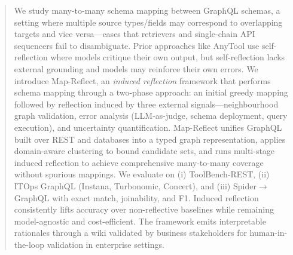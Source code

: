 \documentclass[sigconf, nonacm]{acmart}
\newcommand{\deleted}[1]{\textcolor{red}{#1}}
\begin{document}
\begin{abstract}

We study many-to-many schema mapping between GraphQL schemas, a setting where multiple source types/fields may correspond to overlapping targets and vice versa—cases that retrievers and single-chain API sequencers fail to disambiguate. Prior approaches like AnyTool use self-reflection where models critique their own output, but self-reflection lacks external grounding and models may reinforce their own errors. We introduce Map-Reflect, an \emph{induced reflection} framework that performs schema mapping through a two-phase approach: an initial greedy mapping followed by reflection induced by three external signals—neighbourhood graph validation, error analysis (LLM-as-judge, schema deployment, query execution), and uncertainty quantification. Map-Reflect unifies GraphQL built over REST and databases into a typed graph representation, applies domain-aware clustering to bound candidate sets, and runs multi-stage induced reflection to achieve comprehensive many-to-many coverage without spurious mappings. We evaluate on (i) ToolBench-REST, (ii) ITOps GraphQL (Instana, Turbonomic, Concert), and (iii) Spider$\rightarrow$GraphQL with exact match, joinability, and F1. Induced reflection consistently lifts accuracy over non-reflective baselines while remaining model-agnostic and cost-efficient. The framework emits interpretable rationales through a wiki validated by business stakeholders for human-in-the-loop validation in enterprise settings.
\end{abstract}
\end{document}
